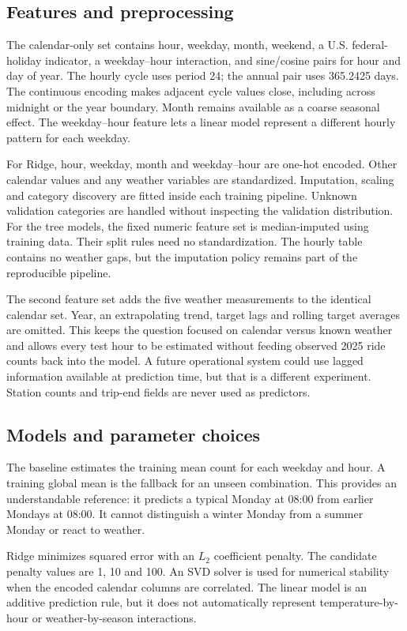 \documentclass[10pt]{article}
\begin{document}
\subsection{Features and preprocessing}
The calendar-only set contains hour, weekday, month, weekend, a U.S. federal-holiday indicator, a weekday--hour interaction, and sine/cosine pairs for hour and day of year. The hourly cycle uses period 24; the annual pair uses 365.2425 days. The continuous encoding makes adjacent cycle values close, including across midnight or the year boundary. Month remains available as a coarse seasonal effect. The weekday--hour feature lets a linear model represent a different hourly pattern for each weekday.

For Ridge, hour, weekday, month and weekday--hour are one-hot encoded. Other calendar values and any weather variables are standardized. Imputation, scaling and category discovery are fitted inside each training pipeline. Unknown validation categories are handled without inspecting the validation distribution. For the tree models, the fixed numeric feature set is median-imputed using training data. Their split rules need no standardization. The hourly table contains no weather gaps, but the imputation policy remains part of the reproducible pipeline.

The second feature set adds the five weather measurements to the identical calendar set. Year, an extrapolating trend, target lags and rolling target averages are omitted. This keeps the question focused on calendar versus known weather and allows every test hour to be estimated without feeding observed 2025 ride counts back into the model. A future operational system could use lagged information available at prediction time, but that is a different experiment. Station counts and trip-end fields are never used as predictors.

\subsection{Models and parameter choices}
The baseline estimates the training mean count for each weekday and hour. A training global mean is the fallback for an unseen combination. This provides an understandable reference: it predicts a typical Monday at 08:00 from earlier Mondays at 08:00. It cannot distinguish a winter Monday from a summer Monday or react to weather.

Ridge minimizes squared error with an $L_2$ coefficient penalty. The candidate penalty values are 1, 10 and 100. An SVD solver is used for numerical stability when the encoded calendar columns are correlated. The linear model is an additive prediction rule, but it does not automatically represent temperature-by-hour or weather-by-season interactions.
\end{document}
